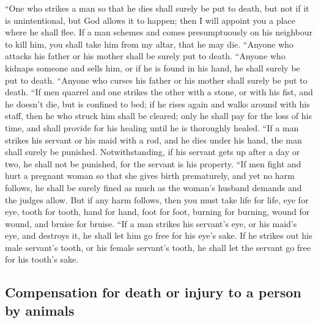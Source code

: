  ``One who strikes a man so that he dies shall surely be
put to death,  but not if it is unintentional, but God
allows it to happen; then I will appoint you a place where he shall
flee.  If a man schemes and comes presumptuously on his
neighbour to kill him, you shall take him from my altar, that he may
die.  ``Anyone who attacks his father or his mother shall
be surely put to death.  ``Anyone who kidnaps someone and
sells him, or if he is found in his hand, he shall surely be put to
death.  ``Anyone who curses his father or his mother
shall surely be put to death.  ``If men quarrel and one
strikes the other with a stone, or with his fist, and he doesn't die,
but is confined to bed;  if he rises again and walks
around with his staff, then he who struck him shall be cleared; only he
shall pay for the loss of his time, and shall provide for his healing
until he is thoroughly healed.  ``If a man strikes his
servant or his maid with a rod, and he dies under his hand, the man
shall surely be punished.  Notwithstanding, if his
servant gets up after a day or two, he shall not be punished, for the
servant is his property.  ``If men fight and hurt a
pregnant woman so that she gives birth prematurely, and yet no harm
follows, he shall be surely fined as much as the woman's husband demands
and the judges allow.  But if any harm follows, then you
must take life for life,  eye for eye, tooth for tooth,
hand for hand, foot for foot,  burning for burning, wound
for wound, and bruise for bruise.  ``If a man strikes his
servant's eye, or his maid's eye, and destroys it, he shall let him go
free for his eye's sake.  If he strikes out his male
servant's tooth, or his female servant's tooth, he shall let the servant
go free for his tooth's sake.

\hypertarget{compensation-for-death-or-injury-to-a-person-by-animals}{%
\subsection{Compensation for death or injury to a person by
animals}\label{compensation-for-death-or-injury-to-a-person-by-animals}}

